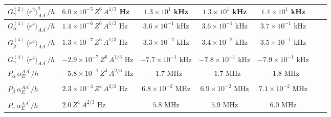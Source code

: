 \documentclass[11pt]{article}
\begin{document}
\begin{table}[htbp]
{\begin{tabular}{@{}llccccc@{}}
$G^{(2)}_{\gamma}\,\langle r^2\rangle^{2}_{AA^\prime}/h$ & $6.0\times10^{-5}\,Z^6\,A^{1/3}$ Hz & $1.3\times10^{1}$ kHz & $1.3\times10^{1}$ kHz & $1.4\times10^{1}$ kHz  \\
\midrule 
$G^{(4)}_{\alpha}\,\langle r^4\rangle_{AA^\prime}/h$ & $1.4\times10^{-6}\,Z^6\,A^{1/3}$ Hz & $3.6\times10^{-1}$ kHz & $3.6\times10^{-1}$ kHz & $3.7\times10^{-1}$ kHz \\ \\[-3mm]
$G^{(4)}_{\beta}\,\langle r^4\rangle_{AA^\prime}/h$ & $1.3\times10^{-7}\,Z^6\,A^{1/3}$ Hz  & $3.3\times10^{-2}$ kHz & $3.4\times10^{-2}$ kHz & $3.5\times10^{-1}$ kHz\\ \\[-3mm]
$G^{(4)}_{\gamma}\,\langle r^4\rangle_{AA^\prime}/h$ & $-2.9\times10^{-7}\,Z^6\,A^{1/3}$ Hz & $-7.7\times10^{-1}$ kHz & $-7.8\times10^{-1}$ kHz & $-7.9\times10^{-1}$ kHz \\
\midrule 
$P_{\alpha}\,\alpha_E^{AA^\prime}/h$ & $-5.8\times10^{-1}\,Z^4\,A^{2/3}$ Hz & $-1.7$ MHz & $-1.7$ MHz & $-1.8$ MHz\\ \\[-3mm]
$P_{\beta}\,\alpha_E^{AA^\prime}/h$ & $2.3\times10^{-3}\,Z^4\,A^{2/3}$ Hz & $6.8\times10^{-2}$ MHz & $6.9\times10^{-2}$ MHz & $7.1\times10^{-2}$ MHz \\ \\[-3mm]
$P_{\gamma}\,\alpha_E^{AA^\prime}/h$ & $2.0\,Z^4\,A^{2/3}$ Hz & $5.8$ MHz & $5.9$ MHz & $6.0$ MHz\\
\bottomrule \bottomrule
\end{tabular}
}
\end{table}
\end{document}
